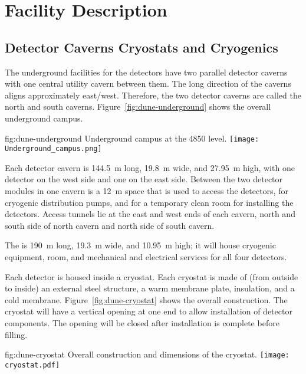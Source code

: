 ﻿\chapter{Facility Description}
\label{vl:tc-facility}


\section{Detector Caverns Cryostats and Cryogenics}
\label{sec:fdsp-coord-faci-caverns}


The underground facilities for the detectors have two parallel
detector caverns with one central utility cavern between them. The
long direction of the caverns aligns approximately
east/west. Therefore, the two detector caverns are called the north
and south caverns. Figure~\ref{fig:dune-underground} shows the overall
underground campus.
\begin{dunefigure}{fig:dune-underground}
  {Underground campus at the 4850 level.}
  \texttt{[image: Underground\_campus.png]}
\end{dunefigure}


Each detector cavern is \SI{144.5}{\meter} long, \SI{19.8}{\meter}
wide, and \SI{27.95}{\meter} high, with one detector on the west side
and one on the east side. Between the two detector modules in one
cavern is a \SI{12}{\meter} space that is used to access the
detectors, for cryogenic distribution pumps, and for a temporary clean
room for installing the detectors. Access tunnels lie at the east and
west ends of each cavern, north and south side of north cavern and
north side of south cavern.


The  is \SI{190}{\meter} long, \SI{19.3}{\meter}
wide, and \SI{10.95}{\meter} high; it will house cryogenic equipment, 
room, and mechanical and electrical services for all four
detectors.


Each detector is housed inside a cryostat. Each cryostat is made of (from
outside to inside) an external steel structure, a warm membrane
plate, insulation, and a cold membrane. Figure~\ref{fig:dune-cryostat}
shows the overall construction. The cryostat will have a vertical
opening at one end to allow installation of detector
components. The opening will be closed after installation is complete before filling.
\begin{dunefigure}{fig:dune-cryostat}
  {Overall construction and dimensions of the  cryostat.}
  \texttt{[image: cryostat.pdf]}
\end{dunefigure}


